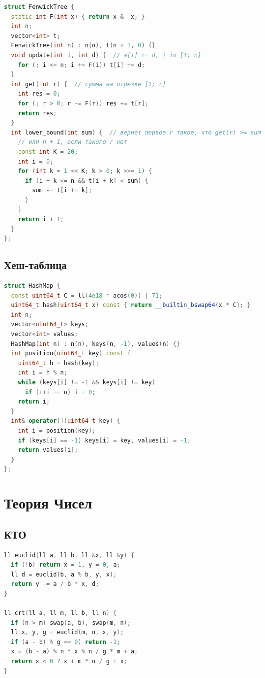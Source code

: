 \documentclass[10pt,a4paper,landscape,twosided]{extarticle}
\begin{document}
\begin{multicols}{3}
\begin{lstlisting}[language=C++]
struct FenwickTree {
  static int F(int x) { return x & -x; }
  int n;
  vector<int> t;
  FenwickTree(int n) : n(n), t(n + 1, 0) {}
  void update(int i, int d) {  // a[i] += d, i in [1; n]
    for (; i <= n; i += F(i)) t[i] += d;
  }
  int get(int r) {  // сумма на отрезке [1; r]
    int res = 0;
    for (; r > 0; r -= F(r)) res += t[r];
    return res;
  }
  int lower_bound(int sum) {  // вернёт первое r такое, что get(r) >= sum
    // или n + 1, если такого r нет
    const int K = 20;
    int i = 0;
    for (int k = 1 << K; k > 0; k >>= 1) {
      if (i + k <= n && t[i + k] < sum) {
        sum -= t[i += k];
      }
    }
    return i + 1;
  }
};
\end{lstlisting}

\subsection{Хеш-таблица}
\begin{lstlisting}[language=C++]
struct HashMap {
  const uint64_t C = ll(4e18 * acos(0)) | 71;
  uint64_t hash(uint64_t x) const { return __builtin_bswap64(x * C); }
  int n;
  vector<uint64_t> keys;
  vector<int> values;
  HashMap(int n) : n(n), keys(n, -1), values(n) {}
  int position(uint64_t key) const {
    uint64_t h = hash(key);
    int i = h % n;
    while (keys[i] != -1 && keys[i] != key)
      if (++i == n) i = 0;
    return i;
  }
  int& operator[](uint64_t key) {
    int i = position(key);
    if (keys[i] == -1) keys[i] = key, values[i] = -1;
    return values[i];
  }
};
\end{lstlisting}

\section{Теория Чисел}

\subsection{КТО}
\begin{lstlisting}[language=C++]
ll euclid(ll a, ll b, ll &x, ll &y) {
  if (!b) return x = 1, y = 0, a;
  ll d = euclid(b, a % b, y, x);
  return y -= a / b * x, d;
}

ll crt(ll a, ll m, ll b, ll n) {
  if (n > m) swap(a, b), swap(m, n);
  ll x, y, g = euclid(m, n, x, y);
  if (a - b) % g == 0) return -1;
  x = (b - a) % n * x % n / g * m + a;
  return x < 0 ? x + m * n / g : x;
}\end{lstlisting}


\end{multicols}
\end{document}

